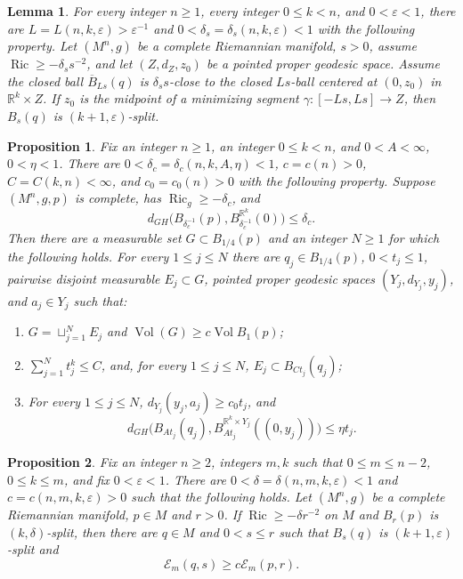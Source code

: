\documentclass[10pt,a4paper]{amsart}
\newtheorem{lemma}{Lemma}
\newtheorem{proposition}{Proposition}
\newcommand{\Ex}{\mathcal E}
\newcommand{\R}{\mathbb R}
\DeclareMathOperator{\Ric}{Ric}
\DeclareMathOperator{\Vol}{Vol}
\newcommand{\eps}{\varepsilon}
\begin{document}
\begin{lemma}\label{lem:finite-segment}
For every integer $n\geq 1$, every integer $0\leq k<n$, and $0<\eps<1$, there are
$L=L(n,k,\eps)>\eps^{-1}$ and
$0<\delta_s=\delta_s(n,k,\eps)<1$ with the following property.
Let $(M^n,g)$ be a complete Riemannian manifold, $s>0$, assume $\Ric\geq -\delta_ss^{-2}$, and let $(Z,d_Z,z_0)$ be a pointed proper geodesic space. Assume the closed ball $\overline B_{Ls}(q)$ is
$\delta_s s$-close to the closed $Ls$-ball centered at $(0,z_0)$ in
$\R^k\times Z$.  If $z_0$ is the midpoint of a minimizing 
segment $\gamma:[-Ls,Ls]\to Z$, then
$B_s(q)$ is $(k+1,\eps)$-split.
\end{lemma}

\begin{proposition}
\label{prop:critical-package}
Fix an integer $n\geq 1$, an integer $0\leq k<n$, and $0<A<\infty$, $0<\eta<1$.
There are $0<\delta_c=\delta_c(n,k,A,\eta)<1$,
$c=c(n)>0$, $C=C(k,n)<\infty$, and $c_0=c_0(n)>0$ with the following
property.  Suppose $(M^n,g,p)$ is complete, has $\Ric_g\geq -\delta_c$, and
\[
 d_{GH}\bigl(B_{\delta_c^{-1}}(p),
             B_{\delta_c^{-1}}^{\R^k}(0)\bigr)\leq\delta_c.
\]
Then there are a measurable set $G\subset B_{1/4}(p)$ and an integer $N\geq 1$ for which the following holds. For every $1\leq j\leq N$ there are $q_j\in B_{1/4}(p)$, $0<t_j\leq 1$, pairwise disjoint measurable $E_j\subset G$, pointed proper geodesic spaces $(Y_j,d_{Y_j},y_j)$, and $a_j\in Y_j$ such that:
\begin{enumerate}[label=\textup{(\roman*)},leftmargin=2.3em]
\item $G=\sqcup_{j=1}^N E_j$ and $\Vol(G)\geq c\Vol B_1(p)$;
\item $\sum_{j=1}^N t_j^k\leq C$, and, for every $1\leq j\leq N$, $E_j\subset B_{Ct_j}(q_j)$;
\item For every $1\leq j\leq N$, $d_{Y_j}(y_j,a_j)\geq c_0t_j$, and
\[
 d_{GH}\bigl(B_{At_j}(q_j),
             B_{At_j}^{\mathbb R^k\times Y_j}((0,y_j))\bigr)\leq\eta t_j.
\]
\end{enumerate}
\end{proposition}

\begin{proposition}
\label{prop:rank-improvement}
Fix an integer $n\geq2$, integers $m,k$ such that $0\leq m\leq n-2$, $0\leq k\leq m$, and fix
$0<\eps<1$.  There are
$0<\delta=\delta(n,m,k,\eps)<1$ and
$c=c(n,m,k,\eps)>0$ such that the following holds. Let $(M^n,g)$ be a complete Riemannian manifold, $p\in M$ and $r>0$. If
$\Ric\geq -\delta r^{-2}$ on $M$ and $B_r(p)$ is $(k,\delta)$-split, then there are
$q\in M$ and $0<s\leq r$ such that $B_s(q)$ is
$(k+1,\eps)$-split and
\begin{equation}\label{eq:rank-volume}
                        \Ex_m(q,s)\geq c\Ex_m(p,r).
\end{equation}
\end{proposition}
\end{document}
